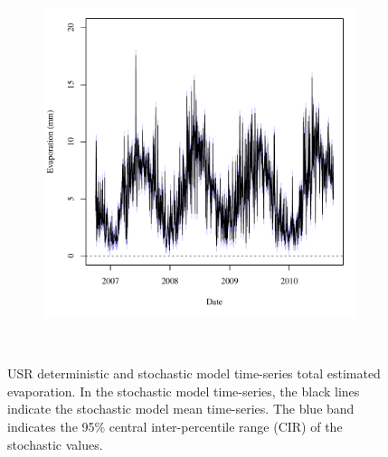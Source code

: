 \begin{landscape}
\begin{figure}
\begin{subfigure}{0.7\textwidth}
			\includegraphics[width=\tableCustomSize]{"Figures/Results_USR/Stochastic/A Evap"}
		\end{subfigure}\\
		\caption[USR deterministic and stochastic model time-series total estimated evaporation.]{USR deterministic and stochastic model time-series total estimated evaporation.  In the stochastic model time-series, the black lines indicate the stochastic model mean time-series.  The blue band indicates the 95\% central inter-percentile range (CIR) of the stochastic values.}
		\label{fig:reachEvap_US}
	\end{figure}
\end{landscape}
\subfiguretop
